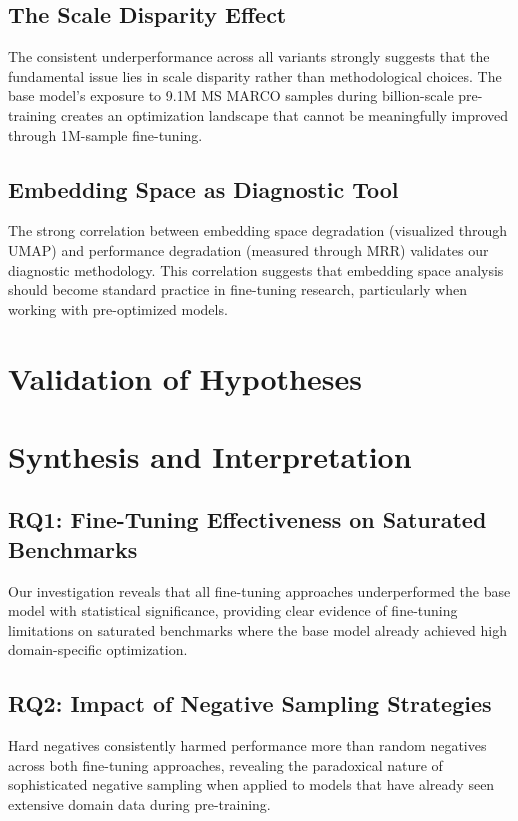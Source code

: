 \subsection{The Scale Disparity Effect}

The consistent underperformance across all variants strongly suggests that the fundamental issue lies in scale disparity rather than methodological choices. The base model's exposure to 9.1M MS MARCO samples during billion-scale pre-training creates an optimization landscape that cannot be meaningfully improved through 1M-sample fine-tuning.

\subsection{Embedding Space as Diagnostic Tool}

The strong correlation between embedding space degradation (visualized through UMAP) and performance degradation (measured through MRR) validates our diagnostic methodology. This correlation suggests that embedding space analysis should become standard practice in fine-tuning research, particularly when working with pre-optimized models.

\section{Validation of Hypotheses}

\section{Synthesis and Interpretation}

\subsection{RQ1: Fine-Tuning Effectiveness on Saturated Benchmarks}

Our investigation reveals that all fine-tuning approaches underperformed the base model with statistical significance, providing clear evidence of fine-tuning limitations on saturated benchmarks where the base model already achieved high domain-specific optimization.

\subsection{RQ2: Impact of Negative Sampling Strategies}

Hard negatives consistently harmed performance more than random negatives across both fine-tuning approaches, revealing the paradoxical nature of sophisticated negative sampling when applied to models that have already seen extensive domain data during pre-training.

